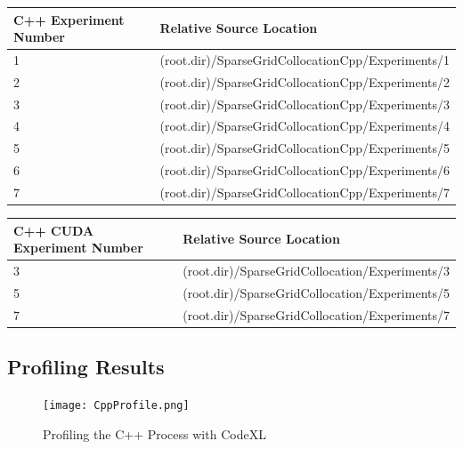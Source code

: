 \documentclass[a4paper]{amsart}
\begin{document}
 \begin{center}
 \begin{tabular}{|p{2cm}|p{10cm}|} 
 \hline
C++ Experiment Number & Relative Source Location \\ [0.5ex] 
 \hline\hline
1  & (root.dir)/SparseGridCollocationCpp/Experiments/1 \\ 
 \hline
2  & (root.dir)/SparseGridCollocationCpp/Experiments/2 \\ 
 \hline
3  & (root.dir)/SparseGridCollocationCpp/Experiments/3 \\ 
 \hline
4  & (root.dir)/SparseGridCollocationCpp/Experiments/4 \\ 
 \hline
5  & (root.dir)/SparseGridCollocationCpp/Experiments/5 \\ 
 \hline
6  & (root.dir)/SparseGridCollocationCpp/Experiments/6 \\ 
 \hline
7  & (root.dir)/SparseGridCollocationCpp/Experiments/7 \\ [1ex] 
 \hline
\end{tabular}
\end{center}

 \begin{center}
 \begin{tabular}{|p{2cm}|p{10cm}|} 
 \hline
C++ CUDA Experiment Number & Relative Source Location \\ [0.5ex] 
 \hline\hline
3  & (root.dir)/SparseGridCollocation/Experiments/3 \\ 
 \hline
5  & (root.dir)/SparseGridCollocation/Experiments/5 \\ 
 \hline
7  & (root.dir)/SparseGridCollocation/Experiments/7 \\ [1ex] 
 \hline
\end{tabular}
\end{center}

\subsection{Profiling Results}

\begin{landscape}
\begin{figure}[h]
\centering
\texttt{[image: CppProfile.png]}
\caption {Profiling the C++ Process with CodeXL}
\label {fig:prof1}
\end{figure}
\end{landscape}
\end{document}
